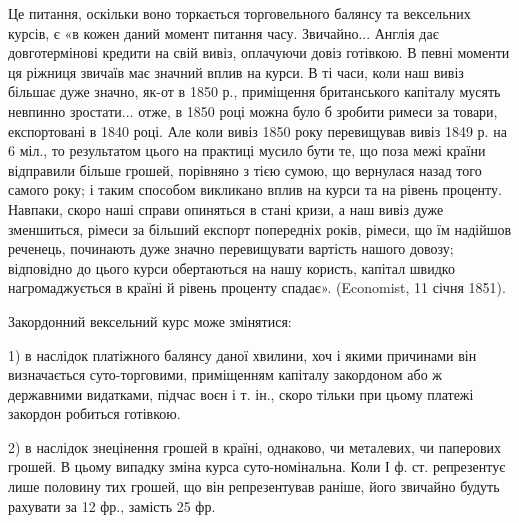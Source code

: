 Це питання, оскільки воно торкається торговельного балянсу та вексельних
курсів, є «в кожен даний момент питання часу. Звичайно... Англія дає
довготермінові кредити на свій вивіз, оплачуючи довіз готівкою. В певні моменти
ця ріжниця звичаїв має значний вплив на курси. В ті часи, коли наш
вивіз більшає дуже значно, як-от в 1850 р., приміщення британського капіталу
мусять невпинно зростати... отже, в 1850 році можна було б зробити римеси
за товари, експортовані в 1840 році. Але коли вивіз 1850 року перевищував
вивіз 1849 р. на 6 міл., то результатом цього на практиці мусило бути те, що
поза межі країни відправили більше грошей, порівняно з тією сумою, що вернулася
назад того самого року; і таким способом викликано вплив на курси
та на рівень проценту. Навпаки, скоро наші справи опиняться в стані кризи,
а наш вивіз дуже зменшиться, рімеси за більший експорт попередніх років, рімеси,
що їм надійшов реченець, починають дуже значно перевищувати вартість нашого
довозу; відповідно до цього курси обертаються на нашу користь, капітал швидко
нагромаджується в країні й рівень проценту спадає». (Economist, 11 січня 1851).

Закордонний вексельний курс може змінятися:

1) в наслідок платіжного балянсу даної хвилини, хоч і якими причинами він
визначається суто-торговими, приміщенням капіталу закордоном або ж державними
видатками, підчас воєн і т. ін., скоро тільки при цьому платежі закордон
робиться готівкою.

2) в наслідок знецінення грошей в країні, однаково, чи металевих, чи
паперових грошей. В цьому випадку зміна курса суто-номінальна. Коли І ф. ст.
репрезентує лише половину тих грошей, що він репрезентував раніше, його
звичайно будуть рахувати за 12  фр., замість 25 фр.
